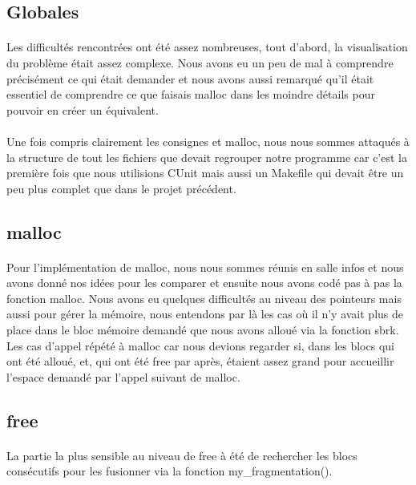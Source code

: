 \documentclass[10pt,a4paper]{article}
\begin{document}
\subsection{Globales}

\paragraph{}Les difficultés rencontrées ont été assez nombreuses, tout d'abord, la visualisation du problème était assez complexe. Nous avons eu un peu de mal à comprendre précisément ce qui était demander et nous avons aussi remarqué qu'il était essentiel de comprendre ce que faisais malloc dans les moindre détails pour pouvoir en créer un équivalent.

\paragraph{}Une fois compris clairement les consignes et malloc, nous nous sommes attaqués à la structure de tout les fichiers que devait regrouper notre programme car c'est la première fois que nous utilisions CUnit mais aussi un Makefile qui devait être un peu plus complet que dans le projet précédent.

\subsection{malloc}

\paragraph{}Pour l'implémentation de malloc, nous nous sommes réunis en salle infos et nous avons donné nos idées pour les comparer et ensuite nous avons codé pas à pas la fonction malloc. Nous avons eu quelques difficultés au niveau des pointeurs mais aussi pour gérer la mémoire, nous entendons par là les cas où il n'y avait plus de place dans le bloc mémoire demandé que nous avons alloué via la fonction sbrk. Les cas d'appel répété à malloc car nous devions regarder si, dans les blocs qui ont été alloué, et, qui ont été free par après, étaient assez grand pour accueillir l'espace demandé par l'appel suivant de malloc.

\subsection{free}

\paragraph{}La partie la plus sensible au niveau de free à été de rechercher les blocs consécutifs pour les fusionner via la fonction my\_fragmentation().
\end{document}
